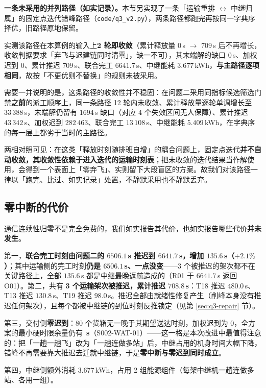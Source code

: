 \textbf{一条未采用的并列路径（如实记录）。}本节另实现了一条「运输重排 $\leftrightarrow$ 中继归属」的固定点迭代错峰路径（\texttt{code/q3\_v2.py}），两条路径都跑完再按同一字典序择优，旧路径原地保留。

实测该路径在本算例的输入上\textbf{2 轮即收敛}（累计释放量 $0$\,s $\to$ $709$\,s 后不再增长，收敛判据要求「弃飞与迟建链同时清零」，缺一不可），其末端解的缺口 $0$\,s、加权迟到 $0$、累计推迟 $709$\,s、联合完工 $6641.7$\,s、中继能耗 $3.677$\,kWh，\textbf{与主路径逐项相同}，故按「不更优则不替换」的规则未被采用。

需要一并说明的是，这条路径的收敛性并不稳固：在问题二采用同指标候选筛选门禁\textbf{之前}的派工顺序上，同一条路径 12 轮内未收敛、累计释放量逐轮单调增长至 $33\,388$\,s，末端解仍留有 $1694$\,s 缺口（对应 4 个失效区间无人保障）、累计推迟 $43\,342$\,s、加权迟到 $282\,463$、联合完工 $13\,108$\,s、中继能耗 $5.409$\,kWh，在字典序的每一层上都劣于当时的主路径。

两相对照可见：在这类「释放时刻随排班自增」的耦合问题上，固定点迭代\textbf{并不自动收敛，其收敛性依赖于进入迭代的运输时刻表}；把未收敛的迭代结果当作解使用，会得到一个表面上「零弃飞」、实则留下大段盲区的方案。故我们对该路径一律以「跑完、比过、如实记录」处置，不静默采用也不静默丢弃。

\subsection{零中断的代价}
\label{sec:q3-cost}

通信连续性归零不是完全免费的，我们如实报告其代价，也如实报告哪些代价\textbf{并未发生}。

第一，\textbf{联合完工时刻由问题二的 $6506.1$\,s 推迟到 $6641.7$\,s，增加 $135.6$\,s（$+2.1\%$）}；其中运输侧的完工时刻\textbf{仍是 $6506.1$\,s、一点没变}——3 个被推迟的架次都不在关键路径上，全部 $135.6$\,s 都是中继最晚返航造成的（R01 于 $6641.7$\,s 返回 O01）。第二，共有 \textbf{3 个运输架次被推迟，累计推迟 $708.8$\,s}：T18 推迟 $480.0$\,s、T13 推迟 $130.8$\,s、T19 推迟 $98.0$\,s。推迟全部由就绪性修复产生（削峰本身没有推迟任何架次），且每个都被中继链的到位时刻反推锁定（见第 \ref{sec:q3-repair} 节）。

第三，交付侧\textbf{零迟到}：80 个货箱无一晚于其期望送达时刻，加权迟到为 $0$，全方案的最小硬时限余量仍有 \textbf{\mtQthreeMinMarginFine\,s}（S002-WAT-01）——这一格是本次改进中最值得注意的：把「一趟一趟飞」改为「一趟连做多站」后，中继占用的机身时间大幅下降，错峰不再需要靠大推迟去迁就中继链，于是\textbf{零中断与零迟到同时成立}。

第四，中继侧额外消耗 $3.677$\,kWh，占用 2 组能源组件（每架中继机一趟连做多站、各用一组）。

